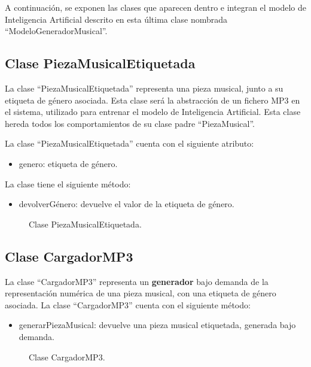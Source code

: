 A continuación, se exponen las clases que aparecen dentro e integran el modelo de Inteligencia Artificial descrito en esta última clase nombrada ``ModeloGeneradorMusical''.

\subsection{Clase PiezaMusicalEtiquetada}

La clase ``PiezaMusicalEtiquetada'' representa una pieza musical, junto a su etiqueta de género asociada. Esta clase será la abstracción de un fichero MP3 en el sistema, utilizado para entrenar el modelo de Inteligencia Artificial. Esta clase hereda todos los comportamientos de su clase padre ``PiezaMusical''.

La clase ``PiezaMusicalEtiquetada'' cuenta con el siguiente atributo:

\begin{itemize}
    \item genero: etiqueta de género.
\end{itemize}

La clase tiene el siguiente método:

\begin{itemize}
    \item devolverGénero: devuelve el valor de la etiqueta de género.
\end{itemize}

\begin{figure}[H]
  \centering
  
  \caption{Clase PiezaMusicalEtiquetada.}
\end{figure}

\subsection{Clase CargadorMP3}

La clase ``CargadorMP3'' representa un \textbf{generador} bajo demanda de la representación numérica de una pieza musical, con una etiqueta de género asociada.
La clase ``CargadorMP3'' cuenta con el siguiente método:

\begin{itemize}
    \item generarPiezaMusical: devuelve una pieza musical etiquetada, generada bajo demanda.
\end{itemize}

\begin{figure}[H]
  \centering
  
  \caption{Clase CargadorMP3.}
\end{figure}

